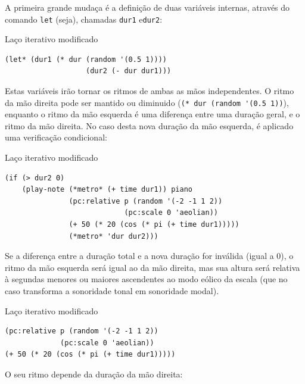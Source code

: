 A primeira grande mudaça é a definição de duas variáveis internas, através do comando \verb|let| (seja), chamadas \verb|dur1| e\verb|dur2|:

\begin{example}{Laço iterativo modificado}
\begin{verbatim}
(let* (dur1 (* dur (random '(0.5 1))))
                   (dur2 (- dur dur1)))
\end{verbatim}
\end{example}

Estas variáveis irão tornar os ritmos de ambas as mãos independentes. O ritmo da mão direita pode ser mantido ou diminuido (\verb|(* dur (random '(0.5 1))|), enquanto o ritmo da mão esquerda é uma diferença entre uma duração geral, e o ritmo da mão direita. No caso desta nova duração da mão esquerda, é aplicado uma verificação condicional:

\begin{example}{Laço iterativo modificado}
\begin{verbatim}
(if (> dur2 0)
    (play-note (*metro* (+ time dur1)) piano
               (pc:relative p (random '(-2 -1 1 2))
                            (pc:scale 0 'aeolian))
               (+ 50 (* 20 (cos (* pi (+ time dur1)))))
               (*metro* 'dur dur2)))
\end{verbatim}
\end{example}

Se a diferença entre a duração total e a nova duração for inválida (igual a $0$), o ritmo da mão esquerda será igual ao da mão direita, mas sua altura será relativa à segundas menores ou maiores ascendentes ao modo eólico da escala (que no caso transforma a sonoridade tonal em sonoridade modal). 

\begin{example}{Laço iterativo modificado}
\begin{verbatim}
(pc:relative p (random '(-2 -1 1 2))
             (pc:scale 0 'aeolian))
(+ 50 (* 20 (cos (* pi (+ time dur1)))))
\end{verbatim}
\end{example}

O seu ritmo depende da duração da mão direita:

